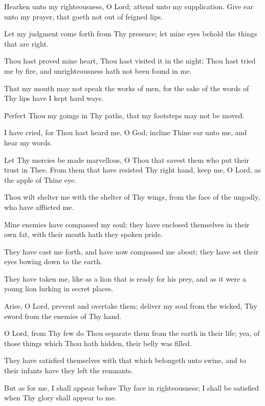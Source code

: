 Hearken unto my righteousness, O Lord; attend unto my supplication. Give ear unto my prayer, that goeth not out of feigned lips.

Let my judgment come forth from Thy presence; let mine eyes behold the things that are right.

Thou hast proved mine heart, Thou hast visited it in the night; Thou hast tried me by fire, and unrighteousness hath not been found in me.

That my mouth may not speak the works of men, for the sake of the words of Thy lips have I kept hard ways.

Perfect Thou my goings in Thy paths, that my footsteps may not be moved.

I have cried, for Thou hast heard me, O God; incline Thine ear unto me, and hear my words.

Let Thy mercies be made marvellous, O Thou that savest them who put their trust in Thee. From them that have resisted Thy right hand, keep me, O Lord, as the apple of Thine eye.

Thou wilt shelter me with the shelter of Thy wings, from the face of the ungodly, who have afflicted me.

Mine enemies have compassed my soul; they have enclosed themselves in their own fat, with their mouth hath they spoken pride.

They have cast me forth, and have now compassed me about; they have set their eyes bowing down to the earth.

They have taken me, like as a lion that is ready for his prey, and as it were a young lion lurking in secret places.

Arise, O Lord, prevent and overtake them; deliver my soul from the wicked, Thy sword from the enemies of Thy hand.

O Lord, from Thy few do Thou separate them from the earth in their life; yea, of those things which Thou hath hidden, their belly was filled.

They have satisfied themselves with that which belongeth unto swine, and to their infants have they left the remnants.

But as for me, I shall appear before Thy face in righteousness; I shall be satisfied when Thy glory shall appear to me.
